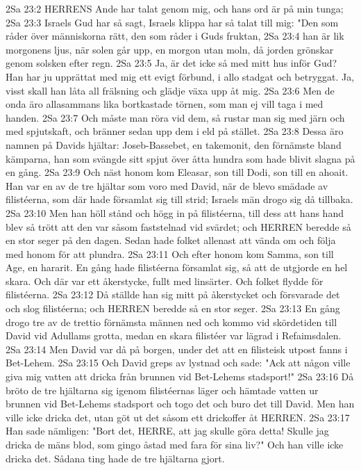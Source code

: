 2Sa 23:2  HERRENS Ande har talat genom mig, och hans ord är på min tunga;
2Sa 23:3  Israels Gud har så sagt, Israels klippa har så talat till mig: "Den som råder över människorna rätt, den som råder i Guds fruktan,
2Sa 23:4  han är lik morgonens ljus, när solen går upp, en morgon utan moln, då jorden grönskar genom solsken efter regn.
2Sa 23:5  Ja, är det icke så med mitt hus inför Gud? Han har ju upprättat med mig ett evigt förbund, i allo stadgat och betryggat. Ja, visst skall han låta all frälsning och glädje växa upp åt mig.
2Sa 23:6  Men de onda äro allasammans lika bortkastade törnen, som man ej vill taga i med handen.
2Sa 23:7  Och måste man röra vid dem, så rustar man sig med järn och med spjutskaft, och bränner sedan upp dem i eld på stället.
2Sa 23:8  Dessa äro namnen på Davids hjältar: Joseb-Bassebet, en takemonit, den förnämste bland kämparna, han som svängde sitt spjut över åtta hundra som hade blivit slagna på en gång.
2Sa 23:9  Och näst honom kom Eleasar, son till Dodi, son till en ahoait. Han var en av de tre hjältar som voro med David, när de blevo smädade av filistéerna, som där hade församlat sig till strid; Israels män drogo sig då tillbaka.
2Sa 23:10  Men han höll stånd och högg in på filistéerna, till dess att hans hand blev så trött att den var såsom faststelnad vid svärdet; och HERREN beredde så en stor seger på den dagen. Sedan hade folket allenast att vända om och följa med honom för att plundra.
2Sa 23:11  Och efter honom kom Samma, son till Age, en hararit. En gång hade filistéerna församlat sig, så att de utgjorde en hel skara. Och där var ett åkerstycke, fullt med linsärter. Och folket flydde för filistéerna.
2Sa 23:12  Då ställde han sig mitt på åkerstycket och försvarade det och slog filistéerna; och HERREN beredde så en stor seger.
2Sa 23:13  En gång drogo tre av de trettio förnämsta männen ned och kommo vid skördetiden till David vid Adullams grotta, medan en skara filistéer var lägrad i Refaimsdalen.
2Sa 23:14  Men David var då på borgen, under det att en filisteisk utpost fanns i Bet-Lehem.
2Sa 23:15  Och David greps av lystnad och sade: "Ack att någon ville giva mig vatten att dricka från brunnen vid Bet-Lehems stadsport!"
2Sa 23:16  Då bröto de tre hjältarna sig igenom filistéernas läger och hämtade vatten ur brunnen vid Bet-Lehems stadsport och togo det och buro det till David. Men han ville icke dricka det, utan göt ut det såsom ett drickoffer åt HERREN.
2Sa 23:17  Han sade nämligen: "Bort det, HERRE, att jag skulle göra detta! Skulle jag dricka de mäns blod, som gingo åstad med fara för sina liv?" Och han ville icke dricka det. Sådana ting hade de tre hjältarna gjort.
